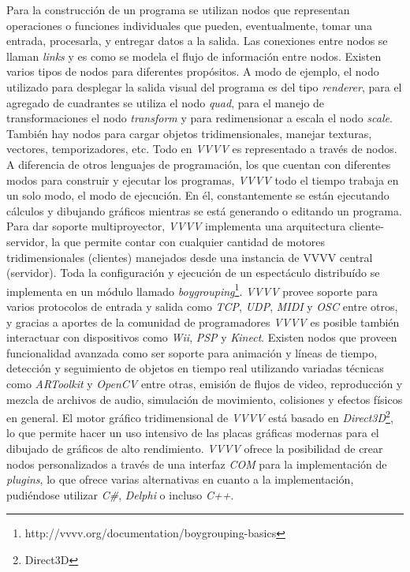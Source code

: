 Para la construcción de un programa se utilizan nodos que representan operaciones o funciones individuales que pueden, eventualmente, tomar una entrada, procesarla, y entregar datos a la salida. Las conexiones entre nodos se llaman \emph{links} y es como se modela el flujo de información entre nodos.
Existen varios tipos de nodos para diferentes propósitos. A modo de ejemplo, el nodo utilizado para desplegar la salida visual del programa es del tipo \emph{renderer}, para el agregado de cuadrantes se utiliza el nodo \emph{quad}, para el manejo de transformaciones el nodo \emph{transform} y para redimensionar a escala el nodo \emph{scale}. También hay nodos para cargar objetos tridimensionales, manejar texturas, vectores, temporizadores, etc. Todo en \emph{VVVV} es representado a través de nodos.
A diferencia de otros lenguajes de programación, los que cuentan con diferentes modos para construir y ejecutar los programas, \emph{VVVV} todo el tiempo trabaja en un solo modo, el modo de ejecución. En él, constantemente se están ejecutando cálculos y dibujando gráficos mientras se está generando o editando un programa.
Para dar soporte multiproyector, \emph{VVVV} implementa una arquitectura cliente-servidor, la que permite contar con cualquier cantidad de motores tridimensionales (clientes) manejados desde una instancia de VVVV central (servidor). Toda la configuración y ejecución de un espectáculo distribuído se implementa en un módulo llamado \emph{boygrouping}\footnote{http://vvvv.org/documentation/boygrouping-basics}.
\emph{VVVV} provee soporte para varios protocolos de entrada y salida como \emph{TCP}, \emph{UDP}, \emph{MIDI} y \emph{OSC} entre otros, y gracias a aportes de la comunidad de programadores \emph{VVVV} es posible también interactuar con dispositivos como \emph{Wii}, \emph{PSP} y \emph{Kinect}. Existen nodos que proveen funcionalidad avanzada como ser soporte para animación y líneas de tiempo, detección y seguimiento de objetos en tiempo real utilizando variadas técnicas como \emph{ARToolkit} y \emph{OpenCV} entre otras, emisión de flujos de video, reproducción y mezcla de archivos de audio, simulación de movimiento, colisiones y efectos físicos en general.
El motor gráfico tridimensional de \emph{VVVV} está basado en \emph{Direct3D}\footnote{Direct3D}, lo que permite hacer un uso intensivo de las placas gráficas modernas para el dibujado de gráficos de alto rendimiento.
\emph{VVVV} ofrece la posibilidad de crear nodos personalizados a través de una interfaz \emph{COM} para la implementación de \emph{plugins}, lo que ofrece varias alternativas en cuanto a la implementación, pudiéndose utilizar \emph{C\#}, \emph{Delphi} o incluso \emph{C++}.

